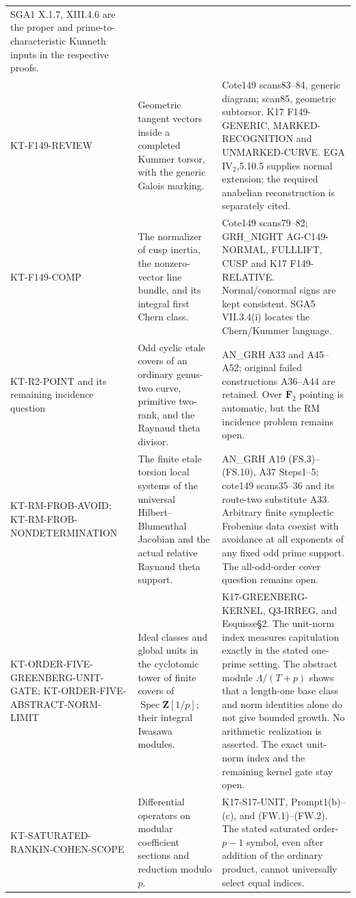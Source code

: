 \documentclass[11pt,a4paper]{article}
\theoremstyle{definition}
\begin{document}
\begin{longtable}{>{\raggedright\arraybackslash}p{}
>{\raggedright\arraybackslash}p{}
>{\raggedright\arraybackslash}p{}}
SGA1 X.1.7, XIII.4.6 are the proper and prime-to-characteristic
Kunneth inputs in the respective proofs.\\
KT-F149-REVIEW &
Geometric tangent vectors inside a completed Kummer torsor,
with the generic Galois marking. &
Cote149 scans83--84, generic diagram; scan85, geometric
subtorsor. K17 F149-GENERIC, MARKED-RECOGNITION and
UNMARKED-CURVE. EGA IV$_2$,5.10.5 supplies normal extension;
the required anabelian reconstruction is separately cited.\\
KT-F149-COMP &
The normalizer of cusp inertia, the nonzero-vector line bundle,
and its integral first Chern class. &
Cote149 scans79--82; GRH\_NIGHT AG-C149-NORMAL, FULLLIFT,
CUSP and K17 F149-RELATIVE. Normal/conormal signs are kept
consistent. SGA5 VII.3.4(i) locates the Chern/Kummer language.\\
KT-R2-POINT and its remaining incidence question &
Odd cyclic etale covers of an ordinary genus-two curve,
primitive two-rank, and the Raynaud theta divisor. &
AN\_GRH A33 and A45--A52; original failed constructions
A36--A44 are retained. Over $\overline{\mathbf F}_2$ pointing
is automatic, but the RM incidence problem remains open.\\
KT-RM-FROB-AVOID; KT-RM-FROB-NONDETERMINATION &
The finite etale torsion local systems of the universal
Hilbert--Blumenthal Jacobian and the actual relative
Raynaud theta support. &
AN\_GRH A19 (FS.3)--(FS.10), A37 Steps1--5;
cote149 scans35--36 and its route-two substitute A33.
Arbitrary finite symplectic Frobenius data coexist with
avoidance at all exponents of any fixed odd prime support.
The all-odd-order cover question remains open.\\
KT-ORDER-FIVE-GREENBERG-UNIT-GATE;
KT-ORDER-FIVE-ABSTRACT-NORM-LIMIT &
Ideal classes and global units in the cyclotomic tower of
finite covers of $\operatorname{Spec}\mathbf Z[1/p]$;
their integral Iwasawa modules. &
K17-GREENBERG-KERNEL, Q3-IRREG, and Esquisse\S2.
The unit-norm index measures capitulation exactly in the stated
one-prime setting. The abstract module $\Lambda/(T+p)$
shows that a length-one base class and norm identities alone
do not give bounded growth. No arithmetic realization is asserted.
The exact unit-norm index and the remaining kernel gate stay open.\\
KT-SATURATED-RANKIN-COHEN-SCOPE &
Differential operators on modular coefficient sections and
reduction modulo $p$. &
K17-S17-UNIT, Prompt1(b)--(c), and (FW.1)--(FW.2).
The stated saturated order-$p-1$ symbol, even after addition
of the ordinary product, cannot universally select equal indices.

\end{longtable}
\end{document}
